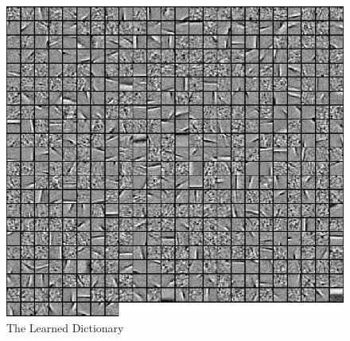\documentclass[letterpaper]{article}
\begin{document}




\begin{figure}[!ht]
		\centering
		\includegraphics[width=.4\textwidth]{figures_dir/dict.png}
		\caption{The Learned Dictionary}
		\label{dictionary}
\end{figure}
\end{document}
